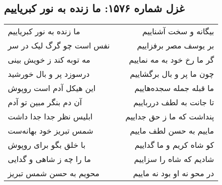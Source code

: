 \begin{center}
\section*{غزل شماره ۱۵۷۶: ما زنده به نور کبریاییم}
\label{sec:1576}
\begin{longtable}{l p{0.5cm} r}
ما زنده به نور کبریاییم
&&
بیگانه و سخت آشناییم
\\
نفس است چو گرگ لیک در سر
&&
بر یوسف مصر برفزاییم
\\
مه توبه کند ز خویش بینی
&&
گر ما رخ خود به مه نماییم
\\
درسوزد پر و بال خورشید
&&
چون ما پر و بال برگشاییم
\\
این هیکل آدم است روپوش
&&
ما قبله جمله سجده‌هاییم
\\
آن دم بنگر مبین تو آدم
&&
تا جانت به لطف دررباییم
\\
ابلیس نظر جدا جدا داشت
&&
پنداشت که ما ز حق جداییم
\\
شمس تبریز خود بهانه‌ست
&&
ماییم به حسن لطف ماییم
\\
با خلق بگو برای روپوش
&&
کو شاه کریم و ما گداییم
\\
ما را چه ز شاهی و گدایی
&&
شادیم که شاه را سزاییم
\\
محویم به حسن شمس تبریز
&&
در محو نه او بود نه ماییم
\\
\end{longtable}
\end{center}
